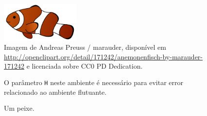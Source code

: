 % 

\begin{figure}[H]
    \centering
    \includegraphics[height=2cm]{figures/anemonenfisch.png} \\
    Imagem de Andreas Preuss / marauder, dispon\'{i}vel em \url{http://openclipart.org/detail/171242/anemonenfisch-by-marauder-171242} e licenciada sobre CC0 PD Dedication.

    O par\^{a}metro \lstinline!H! neste ambiente \'{e} necess\'{a}rio para evitar error relacionado ao ambiente flutuante.
    \caption{Um peixe.}
    \label{fig:example}
\end{figure}
